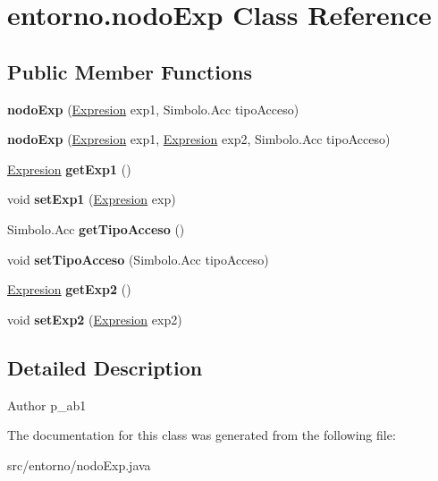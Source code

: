 \hypertarget{classentorno_1_1nodo_exp}{}\section{entorno.\+nodo\+Exp Class Reference}
\label{classentorno_1_1nodo_exp}
\subsection*{Public Member Functions}
\begin{DoxyCompactItemize}
\item 
\mbox{\label{classentorno_1_1nodo_exp_a6f62612e1371b6b7b136d0300873dd2f}} 
{\bfseries nodo\+Exp} (\mbox{\hyperlink{interfaceast_1_1_expresion}{Expresion}} exp1, Simbolo.\+Acc tipo\+Acceso)
\item 
\mbox{\label{classentorno_1_1nodo_exp_ac107d179f4dad7e0b4c502efb8658323}} 
{\bfseries nodo\+Exp} (\mbox{\hyperlink{interfaceast_1_1_expresion}{Expresion}} exp1, \mbox{\hyperlink{interfaceast_1_1_expresion}{Expresion}} exp2, Simbolo.\+Acc tipo\+Acceso)
\item 
\mbox{\label{classentorno_1_1nodo_exp_ac4b421f105548c387ef018a71d81d758}} 
\mbox{\hyperlink{interfaceast_1_1_expresion}{Expresion}} {\bfseries get\+Exp1} ()
\item 
\mbox{\label{classentorno_1_1nodo_exp_adfc2c33135565d52e8f61d409170fa08}} 
void {\bfseries set\+Exp1} (\mbox{\hyperlink{interfaceast_1_1_expresion}{Expresion}} exp)
\item 
\mbox{\label{classentorno_1_1nodo_exp_a5015c3c9f7a4c57d2e8555f6096f4eb1}} 
Simbolo.\+Acc {\bfseries get\+Tipo\+Acceso} ()
\item 
\mbox{\label{classentorno_1_1nodo_exp_a2a472637b568f62b4fe5a7d77fae0cab}} 
void {\bfseries set\+Tipo\+Acceso} (Simbolo.\+Acc tipo\+Acceso)
\item 
\mbox{\label{classentorno_1_1nodo_exp_a0ef0e42cf7b4c354cf5718b1df9a23ec}} 
\mbox{\hyperlink{interfaceast_1_1_expresion}{Expresion}} {\bfseries get\+Exp2} ()
\item 
\mbox{\label{classentorno_1_1nodo_exp_a9dbde43689ca543ca79432ad096f503a}} 
void {\bfseries set\+Exp2} (\mbox{\hyperlink{interfaceast_1_1_expresion}{Expresion}} exp2)
\end{DoxyCompactItemize}


\subsection{Detailed Description}
\begin{DoxyAuthor}{Author}
p\+\_\+ab1 
\end{DoxyAuthor}


The documentation for this class was generated from the following file\+:\begin{DoxyCompactItemize}
\item 
src/entorno/nodo\+Exp.\+java\end{DoxyCompactItemize}
